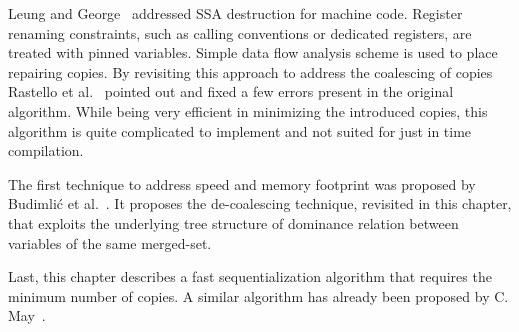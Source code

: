 Leung and George~\cite{leung:1999:ssa_mach} addressed SSA destruction for machine code.
Register renaming constraints, such as calling conventions or dedicated registers, are treated with pinned variables.
Simple data flow analysis scheme is used to place repairing copies.
By revisiting this approach to address the coalescing of copies Rastello et al.~\cite{Rastello:2004:CGO} pointed out and fixed a few errors present in the original algorithm. While being very efficient in minimizing the introduced copies, this algorithm is quite complicated to implement and not suited for just in time compilation.

The first technique to address speed and memory footprint was proposed by Budimli\'{c} et al.~\cite{Budimlic02}. 
It proposes the de-coalescing technique, revisited in this chapter, that exploits the underlying tree structure of dominance relation between variables of the same merged-set.

Last, this chapter describes a fast sequentialization algorithm that requires the minimum number of copies.
A similar algorithm has already been proposed by C. May~\cite{May89}.

